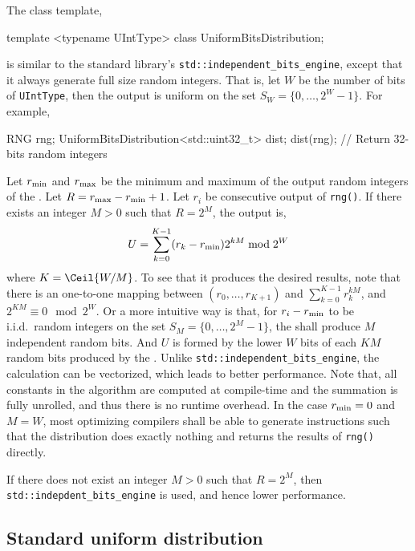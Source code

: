 The class template,
\begin{cppcode}
  template <typename UIntType>
  class UniformBitsDistribution;
\end{cppcode}
is similar to the standard library's \verb|std::independent_bits_engine|,
except that it always generate full size random integers. That is, let $W$ be
the number of bits of \verb|UIntType|, then the output is uniform on the set
$S_W = \{0,\dots,2^W - 1\}$. For example,
\begin{cppcode}
  RNG rng;
  UniformBitsDistribution<std::uint32_t> dist;
  dist(rng); // Return 32-bits random integers
\end{cppcode}
Let $r_{\mathrm{min}}$ and $r_{\mathrm{max}}$ be the minimum and maximum of the output random
integers of the \rng. Let $R = r_{\mathrm{max}} - r_{\mathrm{min}} + 1$. Let $r_i$ be consecutive
output of \verb|rng()|. If there exists an integer $M > 0$ such that $R = 2^M$,
the output is,
\begin{equation*}
  U = \sum_{k = 0}^{K - 1} (r_k - r_{\mathrm{min}}) 2^{kM} \bmod 2^W
\end{equation*}
where $K = \Ceil{W / M}$. To see that it produces the desired results, note
that there is an one-to-one mapping between $(r_0,\dots,r_{K + 1})$ and
$\sum_{k=0}^{K-1}r_k^{kM}$, and $2^{KM}\equiv0\mod2^W$. Or a more intuitive way
is that, for $r_i - r_{\mathrm{min}}$ to be i.i.d.\ random integers on the set $S_M =
\{0,\dots,2^M - 1\}$, the \rng shall produce $M$ independent random bits. And
$U$ is formed by the lower $W$ bits of each $KM$ random bits produced by the
\rng. Unlike \verb|std::independent_bits_engine|, the calculation can be
vectorized, which leads to better performance. Note that, all constants in the
algorithm are computed at compile-time and the summation is fully unrolled, and
thus there is no runtime overhead. In the case $r_{\mathrm{min}} = 0$ and $M = W$, most
optimizing compilers shall be able to generate instructions such that the
distribution does exactly nothing and returns the results of \verb|rng()|
directly.

If there does not exist an integer $M > 0$ such that $R = 2^M$, then
\verb|std::indepdent_bits_engine| is used, and hence lower performance.

\subsection{Standard uniform distribution}
\label{sub:Standard uniform distribution}

